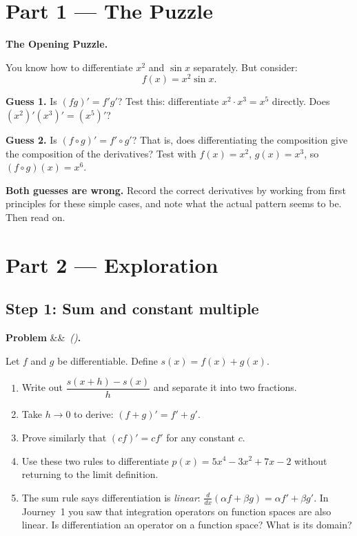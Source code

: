 \documentclass[12pt, a4paper]{article}
\newcounter{problem}
\newenvironment{problem}[1][]{%
  \refstepcounter{problem}%
  \par\vspace{6pt}%
  \noindent\textbf{\color{MidBlue}Problem \theproblem}%
  \ifx&#1&\else\ \textit{(#1)}\fi\textbf{.}\enskip
}{\par\vspace{4pt}}
\begin{document}
\newpage

\section{Part 1 \texorpdfstring{---}{--} The Puzzle}

\begin{puzzlebox}
\textbf{The Opening Puzzle.}

You know how to differentiate $x^2$ and $\sin x$ separately. But consider:
\[
  f(x) = x^2 \sin x.
\]

\textbf{Guess 1.} Is $(fg)' = f'g'$? Test this: differentiate $x^2 \cdot x^3 = x^5$ directly. Does $(x^2)'(x^3)' = (x^5)'$?

\textbf{Guess 2.} Is $(f \circ g)' = f' \circ g'$? That is, does differentiating the composition give the composition of the derivatives? Test with $f(x) = x^2$, $g(x) = x^3$, so $(f\circ g)(x) = x^6$.

\textbf{Both guesses are wrong.} Record the correct derivatives by working from first principles for these simple cases, and note what the actual pattern seems to be. Then read on.
\end{puzzlebox}

\section{Part 2 \texorpdfstring{---}{--} Exploration}

\subsection{Step 1: Sum and constant multiple}

\begin{problem}
\label{prob:sum_rule}
Let $f$ and $g$ be differentiable. Define $s(x) = f(x) + g(x)$.
\begin{enumerate}[label=(\alph*), topsep=2pt]
  \item Write out $\dfrac{s(x+h) - s(x)}{h}$ and separate it into two fractions.
  \item Take $h \to 0$ to derive: $(f + g)' = f' + g'$.
  \item Prove similarly that $(cf)' = c f'$ for any constant $c$.
  \item Use these two rules to differentiate $p(x) = 5x^4 - 3x^2 + 7x - 2$ without returning to the limit definition.
  \item The sum rule says differentiation is \emph{linear}: $\frac{d}{dx}(\alpha f + \beta g) = \alpha f' + \beta g'$. In Journey~1 you saw that integration operators on function spaces are also linear. Is differentiation an operator on a function space? What is its domain?
\end{enumerate}
\end{problem}
\end{document}
